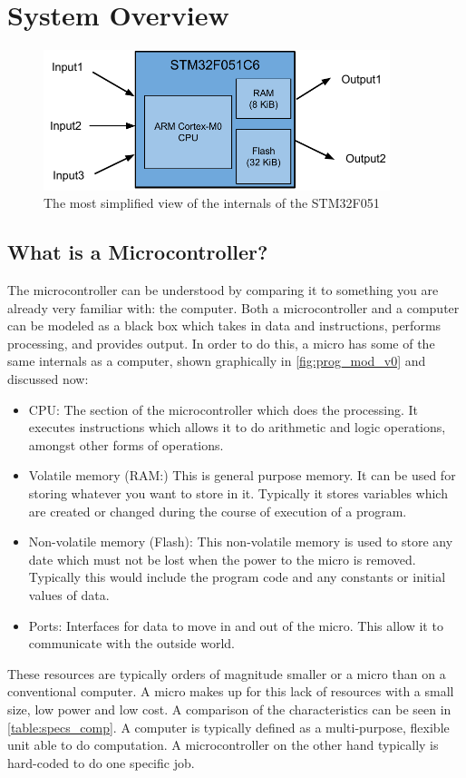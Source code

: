 \chapter{System Overview}

\begin{figure}[t]
  \centering
  \includegraphics[width=0.9\textwidth]{./week1/programmers_model_v0.pdf}
  \caption{The most simplified view of the internals of the STM32F051}
  \label{fig:prog_mod_v0}
\end{figure}

\section{What is a Microcontroller?}
The microcontroller can be understood by comparing it to something you are already very familiar with: the computer. Both a microcontroller and a computer can be modeled as a black box which takes in data and instructions, performs processing, and provides output.
In order to do this, a micro has some of the same internals as a computer, shown graphically in \autoref{fig:prog_mod_v0} and discussed now:
\begin{itemize}
  \item CPU: The section of the microcontroller which does the processing. It executes instructions which allows it to do arithmetic and logic operations, amongst other forms of operations.
  \item  Volatile memory (RAM:) This is general purpose memory. It can be used for storing whatever you want to store in it. Typically it stores variables which are created or changed during the course of execution of a program.
  \item Non-volatile memory (Flash): This non-volatile memory is used to store any date which must not be lost when the power to the micro is removed. Typically this would include the program code and any constants or initial values of data.
  \item Ports: Interfaces for data to move in and out of the micro. This allow it to communicate with the outside world. 
\end{itemize} 
These resources are typically orders of magnitude smaller or a micro than on a conventional computer. A micro makes up for this lack of resources with a small size, low power and low cost. A comparison of the characteristics can be seen in \autoref{table:specs_comp}.
A computer is typically defined as a multi-purpose, flexible unit able to do computation. A microcontroller on the other hand typically is hard-coded to do one specific job.

